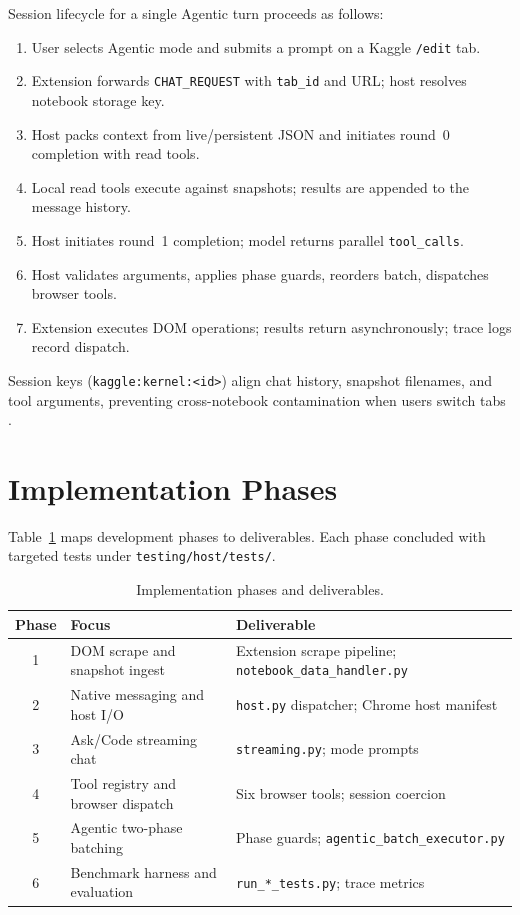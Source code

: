 Session lifecycle for a single Agentic turn proceeds as follows:

\begin{enumerate}
  \item User selects Agentic mode and submits a prompt on a Kaggle \texttt{/edit} tab.
  \item Extension forwards \texttt{CHAT\_REQUEST} with \texttt{tab\_id} and URL; host resolves notebook storage key.
  \item Host packs context from live/persistent JSON and initiates round~0 completion with read tools.
  \item Local read tools execute against snapshots; results are appended to the message history.
  \item Host initiates round~1 completion; model returns parallel \texttt{tool\_calls}.
  \item Host validates arguments, applies phase guards, reorders batch, dispatches browser tools.
  \item Extension executes \ac{DOM} operations; results return asynchronously; trace logs record dispatch.
\end{enumerate}

Session keys (\texttt{kaggle:kernel:<id>}) align chat history, snapshot filenames, and tool arguments, preventing cross-notebook contamination when users switch tabs \parencite{lewis2020rag}.

\section{Implementation Phases}
\label{sec:impl-phases}

Table~\ref{tab:phases} maps development phases to deliverables. Each phase concluded with targeted tests under \texttt{testing/host/tests/}.

\begin{table}[!ht]
\centering
\caption{Implementation phases and deliverables.}
\label{tab:phases}
\small
\begin{tabular}{|c|p{4.2cm}|p{6.8cm}|}
\hline
\textbf{Phase} & \textbf{Focus} & \textbf{Deliverable} \\ \hline
1 & \ac{DOM} scrape and snapshot ingest & Extension scrape pipeline; \texttt{notebook\_data\_handler.py} \\ \hline
2 & Native messaging and host I/O & \texttt{host.py} dispatcher; Chrome host manifest \\ \hline
3 & Ask/Code streaming chat & \texttt{streaming.py}; mode prompts \\ \hline
4 & Tool registry and browser dispatch & Six browser tools; session coercion \\ \hline
5 & Agentic two-phase batching & Phase guards; \texttt{agentic\_batch\_executor.py} \\ \hline
6 & Benchmark harness and evaluation & \texttt{run\_*\_tests.py}; trace metrics \\ \hline
\end{tabular}
\end{table}

